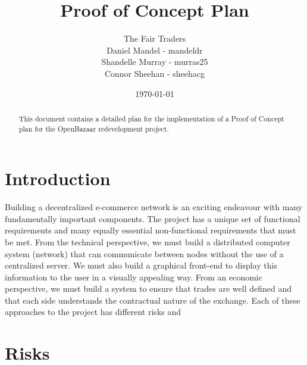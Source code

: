 \documentclass{article}
\begin{document}
\title{Proof of Concept Plan}
\author{The Fair Traders \\ Daniel Mandel - mandeldr \\ Shandelle Murray - murras25 \\ Connor Sheehan - sheehacg}
\date{\today}
\maketitle

\begin{abstract}
This document contains a detailed plan for the implementation of a Proof of Concept plan for the OpenBazaar redevelopment project.
\end{abstract}

\section{Introduction}
Building a decentralized e-commerce network is an exciting endeavour with many fundamentally important components. The project has a unique set of functional requirements and many equally essential non-functional requirements that must be met. From the technical perspective, we must build a distributed computer system (network) that can communicate between nodes without the use of a centralized server. We must also build a graphical front-end to display this information to the user in a visually appealing way. From an economic perspective, we must build a system to ensure that trades are well defined and that each side understands the contractual nature of the exchange. Each of these approaches to the project has different risks and 

\section{Risks}
\end{document}

